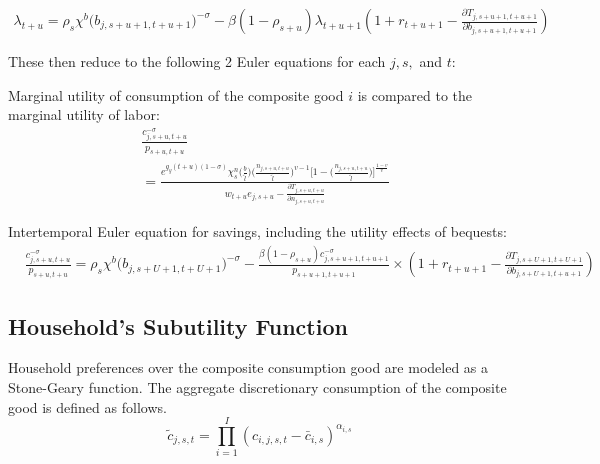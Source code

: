     \begin{equation}
      \begin{split}
      \lambda_{t+u} = \rho_s\chi^b\bigl(b_{j,s+u+1,t+u+1}\bigr)^{-\sigma} - \beta (1-\rho_{s+u}) \lambda_{t+u+1} \left( 1 + r_{t+u+1} - \frac{\partial T_{j,s+u+1,t+u+1}}{\partial b_{j,s+u+1,t+u+1}} \right)
        \end{split}  \nonumber
    \end{equation}

    These then reduce to the following 2 Euler equations for each $j,s,$ and $t$:

    Marginal utility of consumption of the composite good $i$ is compared to the marginal utility of labor:
    \begin{equation}\label{EqcEuler}
      \begin{split}
      & \frac{ c_{j,s+u,t+u}^{-\sigma}}{p_{s+u,t+u}} \\
      & = \frac{ e^{g_y (t+u)(1-\sigma)}\chi^n_{s}\biggl(\frac{b}{\tilde{l}}\biggr)\biggl(\frac{n_{j,s+u,t+u}}{\tilde{l}}\biggr)^{v-1}\Biggl[1 - \biggl(\frac{n_{j,s+u,t+u}}{\tilde{l}}\biggr)\Biggr]^{\frac{1-v}{v}} } { w_{t+u} e_{j,s+u} - \frac{\partial T_{j,s+u,t+u}}{\partial n_{j,s+u,t+u}} }
       \end{split}
    \end{equation}

    Intertemporal Euler equation for savings, including the utility effects of bequests:
    \begin{equation}\label{EqbEuler}
      \begin{split}
      & \frac{ c_{j,s+u,t+u}^{-\sigma}}{p_{s+u,t+u}} = \rho_s\chi^b\bigl(b_{j,s+U+1,t+U+1}\bigr)^{-\sigma}  - \frac{ \beta(1-\rho_{s+u}) c_{j,s+u+1,t+u+1}^{-\sigma}} { p_{s+u+1,t+u+1}} \times \left( 1 + r_{t+u+1} - \frac{\partial T_{j,s+U+1,t+U+1}}{\partial b_{j,s+U+1,t+u+1}} \right)
      \end{split}
    \end{equation}

       
    \subsection{Household's Subutility Function}\label{sec:subutil}
    
    Household preferences over the composite consumption good are modeled as a Stone-Geary function. The aggregate discretionary consumption of the composite good is defined as follows.
    \begin{equation} \label{Eqcagg}
        \tilde{c}_{j,s,t}  = \prod_{i=1}^I \left( c_{i,j,s,t} - \bar c_{i,s} \right) ^{\alpha_{i,s}} 
    \end{equation}

